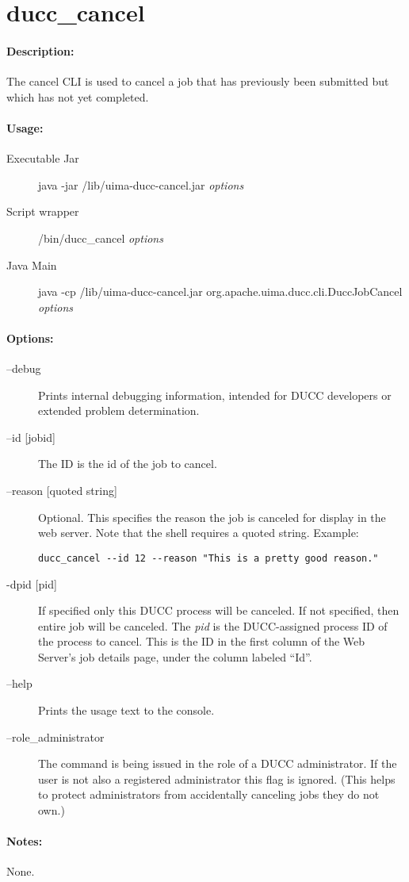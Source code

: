 \ifpdf
\else
{}
\fi
    \section{ducc\_cancel}
    \label{sec:cli.ducc-cancel}

    \paragraph{Description:}
    The cancel CLI is used to cancel a job that has previously been submitted but which has not yet 
    completed. 

    \paragraph{Usage:}
    \begin{description}
    \item[Executable Jar] java -jar \ducchome/lib/uima-ducc-cancel.jar {\em options}
    \item[Script wrapper] \ducchome/bin/ducc\_cancel {\em options}
    \item[Java Main]      java -cp \ducchome/lib/uima-ducc-cancel.jar org.apache.uima.ducc.cli.DuccJobCancel {\em options}
    \end{description}

    \paragraph{Options:}
    \begin{description}
        \item[--debug ]          
          Prints internal debugging information, intended for DUCC developers or extended problem determination.                    
        \item[--id {[jobid]}]
          The ID is the id of the job to cancel.
        \item[--reason {[quoted string]}]
          Optional. This specifies the reason the job is canceled for display in the web server. Note that
          the shell requires a quoted string.  Example:
\begin{verbatim}
ducc_cancel --id 12 --reason "This is a pretty good reason."
\end{verbatim}
        \item[-dpid {[pid]}]
          If specified only this DUCC process will be canceled.  If not
          specified, then entire job will be canceled.  The {\em pid} is the DUCC-assigned process ID of the
          process to cancel.  This is the ID in the first column of the Web Server's job details page, under
          the column labeled ``Id''.
        \item[--help]
          Prints the usage text to the console. 
        \item[--role\_administrator] The command is being issued in the role of a DUCC administrator.
          If the user is not also a registered administrator this flag is ignored.  (This helps to
          protect administrators from accidentally canceling jobs they do not own.)
     \end{description}
        
    \paragraph{Notes:}
    None.

